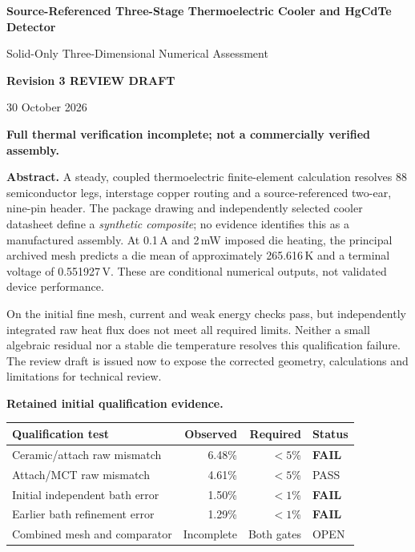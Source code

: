 \documentclass[11pt,a4paper]{article}
\newcommand{\fail}{\textcolor{failure}{\textbf{FAIL}}}
\begin{document}
\thispagestyle{empty}
{\Large\bfseries Source-Referenced Three-Stage Thermoelectric Cooler and HgCdTe Detector\par}
\vspace{5mm}
{\large Solid-Only Three-Dimensional Numerical Assessment\par}
\vspace{4mm}
{\large\bfseries Revision 3 REVIEW DRAFT\par}
30 October 2026

\vspace{4mm}
\textcolor{failure}{\textbf{Full thermal verification incomplete; not a commercially verified assembly.}}

\textbf{Abstract.} A steady, coupled thermoelectric finite-element calculation resolves 88 semiconductor legs, interstage copper routing and a source-referenced two-ear, nine-pin header. The package drawing and independently selected cooler datasheet define a \emph{synthetic composite}; no evidence identifies this as a manufactured assembly. At 0.1\,A and 2\,mW imposed die heating, the principal archived mesh predicts a die mean of approximately 265.616\,K and a terminal voltage of 0.551927\,V. These are conditional numerical outputs, not validated device performance.

On the initial fine mesh, current and weak energy checks pass, but independently integrated raw heat flux does not meet all required limits. Neither a small algebraic residual nor a stable die temperature resolves this qualification failure. The review draft is issued now to expose the corrected geometry, calculations and limitations for technical review.

\textbf{Retained initial qualification evidence.}
\begin{center}\begin{tabularx}{\linewidth}{Xrrl}\toprule
Qualification test & Observed & Required & Status\\\midrule
Ceramic/attach raw mismatch & 6.48\% & $<5$\% & \fail\\
Attach/MCT raw mismatch & 4.61\% & $<5$\% & PASS\\
Initial independent bath error & 1.50\% & $<1$\% & \fail\\
Earlier bath refinement error & 1.29\% & $<1$\% & \fail\\
Combined mesh and comparator & Incomplete & Both gates & OPEN\\\bottomrule
\end{tabularx}\end{center}
\end{document}
